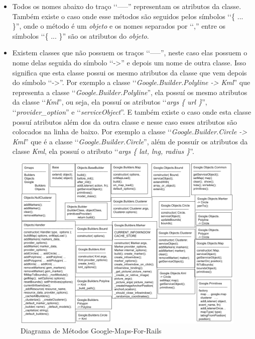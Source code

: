 \begin{itemize}

 \item Todos os nomes abaixo do traço ‘‘-----'' representam os atributos da classe. Também
 existe o caso onde esse métodos são seguidos pelos símbolos ‘‘\{ ... \}'', onde o método é um
 \emph{objeto} e os nomes separados por ‘‘,'' entre os símbolos ‘‘\{ ... \}'' são os atributos
 do \emph{objeto}.

 \item Existem classes que não possuem os traços ‘‘-----'', neste caso elas possuem o nome delas
 seguida do símbolo ‘‘->'' e depois um nome de outra classe. Isso significa que esta classe
 possui os mesmo atributos da classe que vem depois do símbolo ‘‘->''. Por exemplo a
 classe ‘‘\emph{Google.Builder.Polyline -> Kml}'' que representa a classe
 ‘‘\emph{Google.Builder.Polyline}'', ela possuí os mesmo atributos da classe
 ‘‘\emph{Kml}'', ou seja, ela possuí os atributos
 ‘‘\emph{args \{ url \}}'', ‘‘\emph{provider\_option}'' e ‘‘\emph{serviceObject}''. E também existe o caso
 onde esta classe possuí atributos além dos da outra classe e nesse caso esses
 atributos são colocados na linha de baixo. Por exemplo a classe
 ‘‘\emph{Google.Builder.Circle -> Kml}'' que é a classe ‘‘\emph{Google.Builder.Circle}'', além de
 possuír os atributos da classe \emph{Kml}, ela possuí o atributo
 ‘‘\emph{args \{ lat, lng, radius \}}''.

\end{itemize}


\begin{figure}[ht]
  \begin{center}
    \includegraphics[scale=0.35]{images/diagrama_de_metodos_google_maps_for_rails.png}
    \caption{Diagrama de Métodos Google-Maps-For-Rails}
    \label{fig:diagrama_de_metodos_google_maps_for_rails}
  \end{center}
\end{figure}


